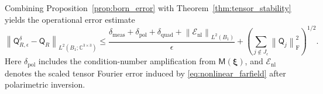 \documentclass[11pt]{article}
\numberwithin{equation}{section}
\newcommand{\C}{\mathbb{C}}
\newcommand{\vect}[1]{\bm{#1}}
\newcommand{\tens}[1]{\bm{\mathsf{#1}}}
\newcommand{\Qt}{\ensuremath{\tens{Q}}}
\newcommand{\Mt}{\ensuremath{\tens{M}}}
\newcommand{\norm}[1]{\left\lVert #1\right\rVert}
\newcommand{\Frob}{\mathrm F}
\theoremstyle{plain}
\theoremstyle{definition}
\begin{document}
Combining Proposition~\ref{prop:born_error} with Theorem~\ref{thm:tensor_stability} yields the operational error estimate
\begin{equation}\label{eq:combined_error}
  \norm{\Qt_{R,\epsilon}^\delta-\Qt_R}_{L^2(B_1;\C^{3\times3})}
  \le \frac{\delta_{\mathrm{meas}}+\delta_{\mathrm{pol}}+\delta_{\mathrm{quad}}+
\norm{\mathcal{E}_{\mathrm{nl}}}_{L^2(B_1)}}{\epsilon}
  +\left(\sum_{j\notin J_\epsilon}\norm{\tens{Q}_j}_{\Frob}^2\right)^{1/2}.
\end{equation}
Here $\delta_{\mathrm{pol}}$ includes the condition-number amplification from $\Mt(\vect{\xi})$, and $\mathcal{E}_{\mathrm{nl}}$ denotes the scaled tensor Fourier error induced by \eqref{eq:nonlinear_farfield} after polarimetric inversion.




\end{document}
